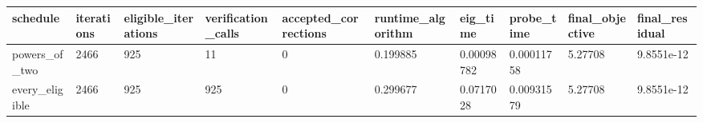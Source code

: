 \begin{tabular}{llllllllll}
\toprule
schedule & iterations & eligible\_iterations & verification\_calls & accepted\_corrections & runtime\_algorithm & eig\_time & probe\_time & final\_objective & final\_residual \\
\midrule
powers\_of\_two & 2466 & 925 & 11 & 0 & 0.199885 & 0.00098782 & 0.00011758 & 5.27708 & 9.8551e-12 \\
every\_eligible & 2466 & 925 & 925 & 0 & 0.299677 & 0.0717028 & 0.00931579 & 5.27708 & 9.8551e-12 \\
\bottomrule
\end{tabular}
